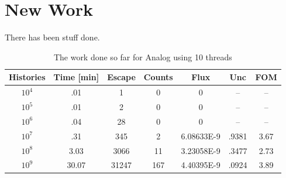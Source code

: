 \documentclass{article}
\begin{document}
\section{New Work}
There has been stuff done.

\begin{table}
\begin{center}
\label{tbl_decay}
\caption{The work done so far for Analog using 10 threads}
\begin{tabular}{|c|c|c|c|c|c|c|}
\hline
\textbf{Histories} & \textbf{Time [min]} & \textbf{Escape} & \textbf{Counts} & \textbf{Flux} & \textbf{Unc} & \textbf{FOM} \\ \hline
$10^4$ & .01 & 1 & 0 & 0 & -- & -- \\ \hline
$10^5$ & .01 & 2 & 0 & 0 & -- & -- \\ \hline
$10^6$ & .04 & 28 & 0 & 0 & -- & -- \\ \hline
$10^7$ & .31 & 345 & 2 & 6.08633E-9 & .9381 & 3.67 \\ \hline
$10^8$ & 3.03 & 3066 & 11 & 3.23058E-9 & .3477 & 2.73 \\ \hline
$10^9$ & 30.07 & 31247 & 167 & 4.40395E-9 & .0924 & 3.89 \\ \hline
\end{tabular}
\end{center}
\end{table}
\end{document}
